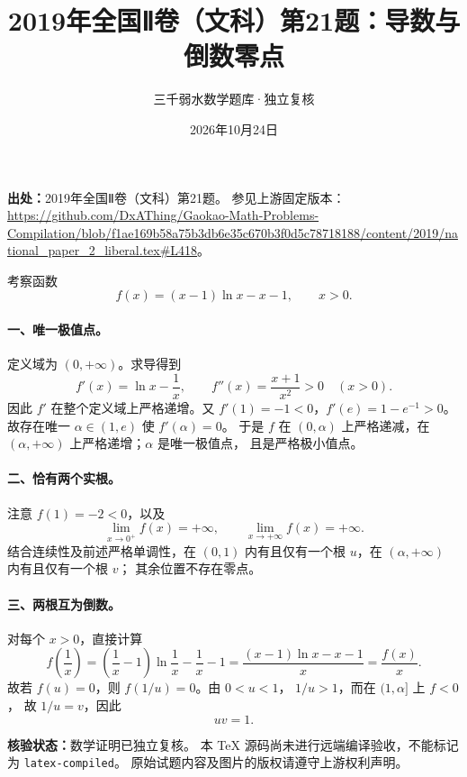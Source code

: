 \documentclass[11pt,a4paper,UTF8]{ctexart}
\title{2019年全国Ⅱ卷（文科）第21题：导数与倒数零点}
\author{三千弱水数学题库·独立复核}
\date{2026年10月24日}
\begin{document}
\maketitle

\noindent\textbf{出处：}2019年全国Ⅱ卷（文科）第21题。
参见上游固定版本：
\url{https://github.com/DxAThing/Gaokao-Math-Problems-Compilation/blob/f1ae169b58a75b3db6e35c670b3f0d5c78718188/content/2019/national_paper_2_liberal.tex#L418}。

\medskip
考察函数
\[
  f(x)=(x-1)\ln x-x-1,\qquad x>0.
\]

\paragraph{一、唯一极值点。}
定义域为 $(0,+\infty)$。求导得到
\[
 f'(x)=\ln x-\frac1x,\qquad
 f''(x)=\frac{x+1}{x^2}>0 \quad(x>0).
\]
因此 $f'$ 在整个定义域上严格递增。又
$f'(1)=-1<0$，$f'(e)=1-e^{-1}>0$。
故存在唯一 $\alpha\in(1,e)$ 使 $f'(\alpha)=0$。
于是 $f$ 在 $(0,\alpha)$ 上严格递减，在
$(\alpha,+\infty)$ 上严格递增；$\alpha$ 是唯一极值点，
且是严格极小值点。

\paragraph{二、恰有两个实根。}
注意 $f(1)=-2<0$，以及
\[
 \lim_{x\to0^+}f(x)=+\infty,
 \qquad \lim_{x\to+\infty}f(x)=+\infty.
\]
结合连续性及前述严格单调性，在 $(0,1)$ 内有且仅有一个根
$u$，在 $(\alpha,+\infty)$ 内有且仅有一个根 $v$；
其余位置不存在零点。

\paragraph{三、两根互为倒数。}
对每个 $x>0$，直接计算
\[
 f\!\left(\frac1x\right)
 =\left(\frac1x-1\right)\ln\frac1x-\frac1x-1
 =\frac{(x-1)\ln x-x-1}{x}
 =\frac{f(x)}{x}.
\]
故若 $f(u)=0$，则 $f(1/u)=0$。由 $0<u<1$，
$1/u>1$，而在 $(1,\alpha]$ 上 $f<0$，
故 $1/u=v$，因此
\[
 \boxed{uv=1}.
\]

\bigskip
\noindent\textbf{核验状态：}数学证明已独立复核。
本 TeX 源码尚未进行远端编译验收，不能标记为 \texttt{latex-compiled}。
原始试题内容及图片的版权请遵守上游权利声明。
\end{document}
